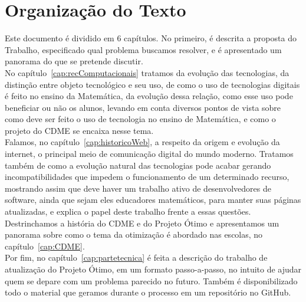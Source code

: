 \section{Organização do Texto}

Este documento é dividido em 6 capítulos. No primeiro, é descrita a proposta do Trabalho, especificado qual problema buscamos resolver, e é apresentado um panorama do que se pretende discutir.
\\

No capítulo~\ref{cap:recComputacionais} tratamos da evolução das tecnologias, da distinção entre objeto tecnológico e seu uso, de como o uso de tecnologias digitais é feito no ensino da Matemática, da evolução dessa relação, como esse uso pode beneficiar ou não os alunos, levando em conta diversos pontos de vista sobre como deve ser feito o uso de tecnologia no ensino de Matemática, e como o projeto do CDME se encaixa nesse tema.
\\

Falamos, no capítulo~\ref{cap:historicoWeb}, a respeito da origem e evolução da internet, o principal meio de comunicação digital do mundo moderno. Tratamos também de como a evolução natural das tecnologias pode acabar gerando incompatibilidades que impedem o funcionamento de um determinado recurso, mostrando assim que deve haver um trabalho ativo de desenvolvedores de software, ainda que sejam eles educadores matemáticos, para manter suas páginas atualizadas, e explica o papel deste trabalho frente a essas questões.
\\

Destrinchamos a história do CDME e do Projeto Ótimo e apresentamos um panorama sobre como o tema da otimização é abordado nas escolas, no capítulo~\ref{cap:CDME}.
\\

Por fim, no capítulo~\ref{cap:partetecnica} é feita a descrição do trabalho de atualização do Projeto Ótimo, em um formato passo-a-passo, no intuito de ajudar quem se depare com um problema parecido no futuro. Também é disponibilizado todo o material que geramos durante o processo em um repositório no GitHub.